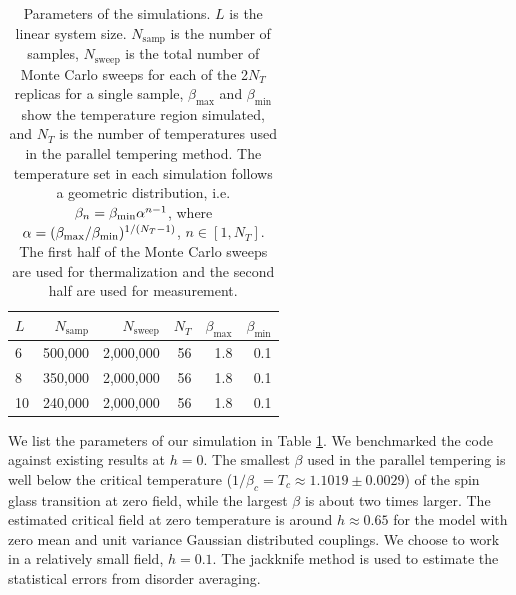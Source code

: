 \documentclass[aps,prb,twocolumn,showpacs,superscriptaddress]{revtex4}
\begin{document}
\begin{table}[ht]
  \centering
  \caption{Parameters of the simulations.  $L$ is the linear system size.
$N_{\mathrm{samp}}$ is the number of samples, 
$N_{\mathrm{sweep}}$ is the total number of Monte Carlo sweeps for each of the 2$N_T$ replicas 
for a single sample, $\beta_{\mathrm{max}}$ and $\beta_{\mathrm{min}}$ show the temperature 
region simulated, and $N_T$ is the number of temperatures used in the parallel tempering method. 
The temperature set in each simulation follows a geometric distribution, 
i.e. $\beta_n=\beta_{\rm min}\alpha^{n-1}$, where $\alpha=(\beta_{\rm max}/\beta_{\rm min})^{1/(N_T-1)}$, $n\in [1,N_T]$.
The first half of the Monte Carlo sweeps are used for thermalization and the second half are used for measurement.}
 \begin{ruledtabular}
 \begin{tabular}{lrrrrr}
    $L$&$N_{\mathrm{samp}}$&$N_{\mathrm{sweep}}$& $N_T$  &$\beta_{\mathrm{max}}$ &  $\beta_{\mathrm{min}}$  \\
\hline
6&500,000&2,000,000&56&1.8&0.1\\
8&350,000&2,000,000&56&1.8&0.1\\
10&240,000&2,000,000&56&1.8&0.1\\
  \end{tabular}
\end{ruledtabular}
  \label{tab:parameters}
\end{table}

We list the parameters of our simulation in Table \ref{tab:parameters}. We 
benchmarked the code against existing results at $h=0$.  The smallest 
$\beta$ used in the parallel tempering is well below the critical temperature ($1/\beta_{c} = T_{c} \approx 1.1019 \pm 0.0029$) \cite{Baity-Jesi-etal-2013} of 
the spin glass transition at zero field\cite{Ballesteros2000,Baity-Jesi-etal-2013}, while the largest $\beta$ 
is about two times larger.  The estimated critical field at zero temperature is around $h \approx 0.65$ for 
the model with zero mean and unit variance Gaussian distributed couplings\cite{Krzakala-etal-2001}. 
We choose to work in a relatively small field, $h=0.1$. 
The jackknife method is used to estimate the statistical errors from disorder averaging. 
\end{document}
